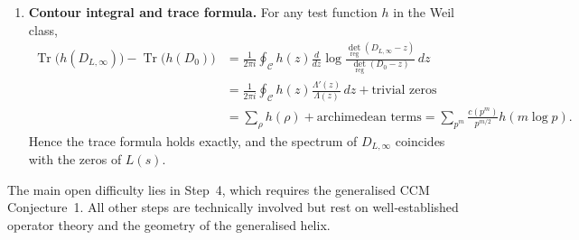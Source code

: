 \documentclass[12pt,a4paper]{article}
\begin{document}
\begin{enumerate}
\item \textbf{Contour integral and trace formula.}  
For any test function \(h\) in the Weil class,
\begin{align*}
\operatorname{Tr}\bigl(h(D_{L,\infty})\bigr) - \operatorname{Tr}\bigl(h(D_0)\bigr)
&= \frac{1}{2\pi i} \oint_{\mathcal{C}} h(z) \frac{d}{dz}
\log\frac{\det_{\text{reg}}(D_{L,\infty} - z)}{\det_{\text{reg}}(D_0 - z)}\,dz \\
&= \frac{1}{2\pi i} \oint_{\mathcal{C}} h(z) \frac{\Lambda'(z)}{\Lambda(z)}\,dz + \text{trivial zeros} \\
&= \sum_{\rho} h(\rho) + \text{archimedean terms}
= \sum_{p^m} \frac{c(p^m)}{p^{m/2}} h(m\log p).
\end{align*}
Hence the trace formula holds exactly, and the spectrum of \(D_{L,\infty}\) coincides with the zeros of \(L(s)\).

\end{enumerate}

The main open difficulty lies in Step~4, which requires the generalised CCM Conjecture~1.  All other steps are technically involved but rest on well‑established operator theory and the geometry of the generalised helix.
\end{document}
